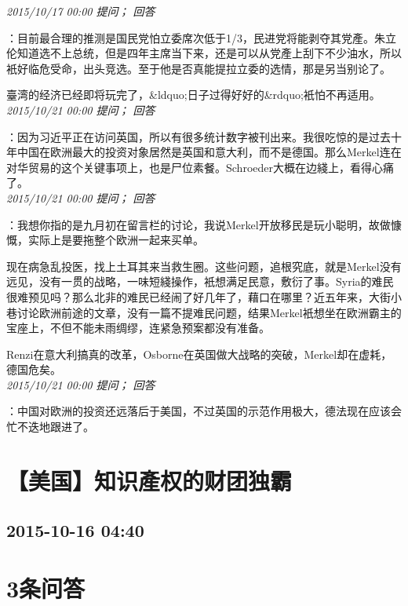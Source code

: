 \documentclass[twocolumn]{ctexart}
\begin{document}
\textit{\hfill\noindent\small 2015/10/17 00:00 提问； 回答}

：目前最合理的推测是国民党怕立委席次低于1/3，民进党将能剥夺其党產。朱立伦知道选不上总统，但是四年主席当下来，还是可以从党產上刮下不少油水，所以衹好临危受命，出头竞选。至于他是否真能提拉立委的选情，那是另当别论了。

臺湾的经济已经即将玩完了，\&ldquo;日子过得好好的\&rdquo;衹怕不再适用。\\

\textit{\hfill\noindent\small 2015/10/21 00:00 提问； 回答}

：因为习近平正在访问英国，所以有很多统计数字被刊出来。我很吃惊的是过去十年中国在欧洲最大的投资对象居然是英国和意大利，而不是德国。那么Merkel连在对华贸易的这个关键事项上，也是尸位素餐。Schroeder大概在边綫上，看得心痛了。\\

\textit{\hfill\noindent\small 2015/10/21 00:00 提问； 回答}

：我想你指的是九月初在留言栏的讨论，我说Merkel开放移民是玩小聪明，故做慷慨，实际上是要拖整个欧洲一起来买单。

现在病急乱投医，找上土耳其来当救生圈。这些问题，追根究底，就是Merkel没有远见，没有一贯的战略，一味短綫操作，衹想满足民意，敷衍了事。Syria的难民很难预见吗？那么北非的难民已经闹了好几年了，藉口在哪里？近五年来，大街小巷讨论欧洲前途的文章，没有一篇不提难民问题，结果Merkel衹想坐在欧洲霸主的宝座上，不但不能未雨绸缪，连紧急预案都没有准备。

Renzi在意大利搞真的改革，Osborne在英国做大战略的突破，Merkel却在虚耗，德国危矣。\\

\textit{\hfill\noindent\small 2015/10/21 00:00 提问； 回答}

：中国对欧洲的投资还远落后于美国，不过英国的示范作用极大，德法现在应该会忙不迭地跟进了。\\


\section{【美国】知识產权的财团独霸}
\subsection{2015-10-16 04:40}


\section{3条问答}
\end{document}
